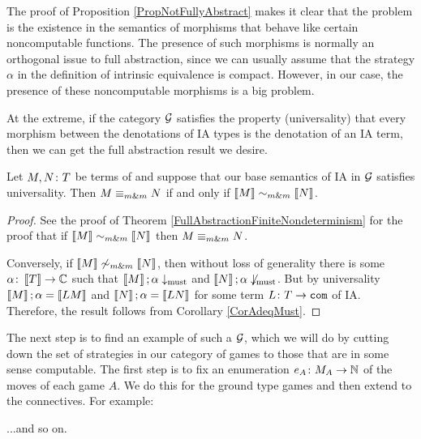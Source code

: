 \documentclass[11pt]{report}
\begin{document}
The proof of Proposition \ref{PropNotFullyAbstract} makes it clear that the problem is the existence in the semantics of morphisms that behave like certain noncomputable functions.  
The presence of such morphisms is normally an orthogonal issue to full abstraction, since we can usually assume that the strategy $\alpha$ in the definition of intrinsic equivalence is compact.
However, in our case, the presence of these noncomputable morphisms is a big problem.

At the extreme, if the category $\mathcal G$ satisfies the property (universality) that every morphism between the denotations of IA types is the denotation of an IA term, then we can get the full abstraction result we desire.

\begin{theorem}
  Let $M,N\colon T$ be terms of \IAX and suppose that our base semantics of IA in $\mathcal G$ satisfies universality.  
  Then $M\mathrel{\equiv_{m\&m}} N$ if and only if $\left\llbracket M\right\rrbracket \mathrel{\sim_{m\&m}} \left\llbracket N\right\rrbracket$.
\end{theorem}
\begin{proof}
  See the proof of Theorem \ref{FullAbstractionFiniteNondeterminism} for the proof that if $\left\llbracket M\right\rrbracket \mathrel{\sim_{m\&m}} \left\llbracket N\right\rrbracket$ then $M\mathrel{\equiv_{m\&m}} N$.  

  Conversely, if $\left\llbracket M\right\rrbracket \not\mathrel{\sim_{m\&m}} \left\llbracket N\right\rrbracket$, then without loss of generality there is some $\alpha\colon\left\llbracket T\right\rrbracket \to \mathbb{C}$ such that $\left\llbracket M\right\rrbracket;\alpha \downarrow_{\operatorname{must}}$ and $\left\llbracket N\right\rrbracket;\alpha\not\downarrow_{\operatorname{must}}$.  
  But by universality $\left\llbracket M\right\rrbracket;\alpha = \left\llbracket LM\right\rrbracket$ and $\left\llbracket N\right\rrbracket;\alpha=\left\llbracket LN\right\rrbracket$ for some term $L\colon T \to {\mathtt{com}}$ of IA.  
  Therefore, the result follows from Corollary \ref{CorAdeqMust}.
\end{proof}

The next step is to find an example of such a $\mathcal G$, which we will do by cutting down the set of strategies in our category of games to those that are in some sense computable.  
The first step is to fix an enumeration $e_A\colon M_A \to \mathbb{N}$ of the moves of each game $A$.  
We do this for the ground type games and then extend to the connectives.  
For example:
...and so on.
\end{document}
